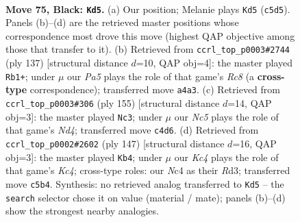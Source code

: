 \documentclass[11pt]{article}
\begin{document}
\clearpage

\begin{figure}[p]\centering
\begin{subfigure}{0.46\textwidth}\centering
\resizebox{\linewidth}{!}{%
\newchessgame
\chessboard[
  setfen={8/7R/6pP/2k2p2/p1n2P2/8/7K/8 b - - 0 75},
  showmover=false,
  pgfstyle=straightmove, color=movearrow, markmove={c5-d5}
]}
\caption{}
\end{subfigure}\hfill
\begin{subfigure}{0.46\textwidth}\centering
\resizebox{\linewidth}{!}{%
\newchessgame
\chessboard[
  setfen={1R6/1P4k1/5p2/6p1/6P1/1K6/8/2r5 b - - 12 69},
  showmover=false,
  pgfstyle=straightmove, color=movearrow, markmove={c1-b1}
]}
\caption{}
\end{subfigure}
\\[4pt]
\begin{subfigure}{0.46\textwidth}\centering
\resizebox{\linewidth}{!}{%
\newchessgame
\chessboard[
  setfen={4R3/8/8/3n1K2/1p1k4/p5P1/P7/8 b - - 0 78},
  showmover=false,
  pgfstyle=straightmove, color=movearrow, markmove={d5-c3}
]}
\caption{}
\end{subfigure}\hfill
\begin{subfigure}{0.46\textwidth}\centering
\resizebox{\linewidth}{!}{%
\newchessgame
\chessboard[
  setfen={8/8/R7/P1k3pP/6P1/1p1r4/6K1/8 b - - 0 74},
  showmover=false,
  pgfstyle=straightmove, color=movearrow, markmove={c5-b4}
]}
\caption{}
\end{subfigure}
\caption{\textbf{Move 75, Black: \texttt{Kd5}.} (a) Our position; Melanie plays \texttt{Kd5} (\texttt{c5d5}). Panels (b)--(d) are the retrieved master positions whose correspondence most drove this move (highest QAP objective among those that transfer to it). (b) Retrieved from \texttt{ccrl\_top\_p0003\#2744} (ply 137) [structural distance $d$=10, QAP obj=4]: the master played \texttt{Rb1+}; under $\mu$ our \emph{Pa5} plays the role of that game's \emph{Rc8} (a \textbf{cross-type} correspondence); transferred move \texttt{a4a3}. (c) Retrieved from \texttt{ccrl\_top\_p0003\#306} (ply 155) [structural distance $d$=14, QAP obj=3]: the master played \texttt{Nc3}; under $\mu$ our \emph{Nc5} plays the role of that game's \emph{Nd4}; transferred move \texttt{c4d6}. (d) Retrieved from \texttt{ccrl\_top\_p0002\#2602} (ply 147) [structural distance $d$=16, QAP obj=3]: the master played \texttt{Kb4}; under $\mu$ our \emph{Kc4} plays the role of that game's \emph{Kc4}; cross-type roles: our \emph{N}c4 as their \emph{R}d3; transferred move \texttt{c5b4}. Synthesis: no retrieved analog transferred to \texttt{Kd5} -- the \texttt{search} selector chose it on value (material / mate); panels (b)--(d) show the strongest nearby analogies.}
\label{fig:thought-m149}
\end{figure}
\end{document}
